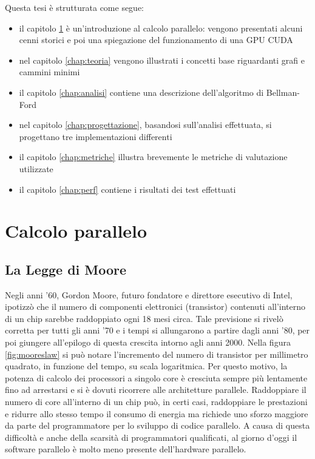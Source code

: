 \documentclass[12pt,a4paper,oneside]{book}
\begin{document}
	Questa tesi è strutturata come segue:
	\begin{itemize}
		\item il capitolo \ref{chap:storia} è un'introduzione al calcolo parallelo: vengono presentati alcuni cenni storici e poi una spiegazione del funzionamento di una GPU CUDA
		\item nel capitolo \ref{chap:teoria} vengono illustrati i concetti base riguardanti grafi e cammini minimi
		\item il capitolo \ref{chap:analisi} contiene una descrizione dell'algoritmo di Bellman-Ford
		\item nel capitolo \ref{chap:progettazione}, basandosi sull'analisi effettuata, si progettano tre implementazioni differenti
		\item il capitolo \ref{chap:metriche} illustra brevemente le metriche di valutazione utilizzate
		\item il capitolo \ref{chap:perf} contiene i risultati dei test effettuati
	\end{itemize}
	
	\chapter{Calcolo parallelo}
	\label{chap:storia}
	\section{La Legge di Moore}
	Negli anni '60, Gordon Moore, futuro fondatore e direttore esecutivo di Intel, ipotizzò che il numero di componenti elettronici (transistor) contenuti all'interno di un chip sarebbe raddoppiato ogni 18 mesi circa\cite{moore1975progress}. Tale previsione si rivelò corretta per tutti gli anni '70 e i tempi si allungarono a partire dagli anni '80, per poi giungere all'epilogo di questa crescita intorno agli anni 2000. Nella figura \ref{fig:mooreslaw} si può notare l'incremento del numero di transistor per millimetro quadrato, in funzione del tempo, su scala logaritmica. Per questo motivo, la potenza di calcolo dei processori a singolo core è cresciuta sempre più lentamente fino ad arrestarsi e si è dovuti ricorrere alle architetture parallele. Raddoppiare il numero di core all'interno di un chip può, in certi casi, raddoppiare le prestazioni e ridurre allo stesso tempo il consumo di energia ma richiede uno sforzo maggiore da parte del programmatore per lo sviluppo di codice parallelo. A causa di questa difficoltà e anche della scarsità di programmatori qualificati, al giorno d'oggi il software parallelo è molto meno presente dell'hardware parallelo.
	
\end{document}
